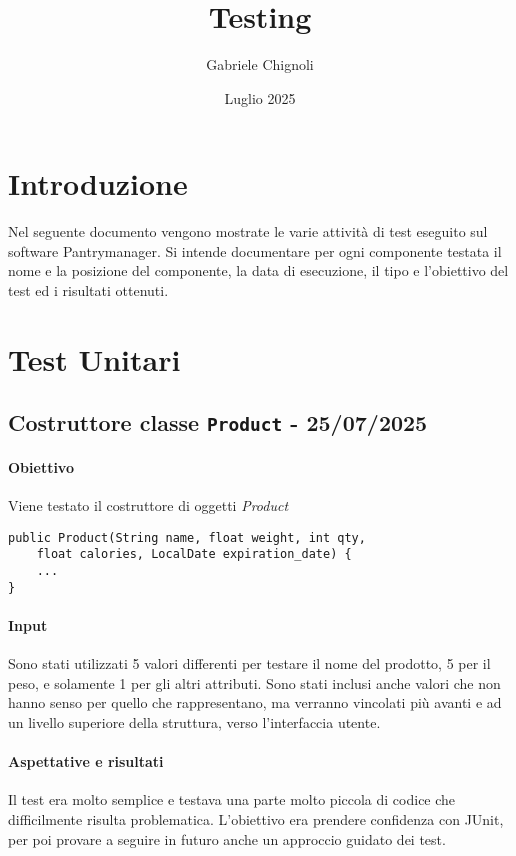 \documentclass{article}
\title{\huge Testing}
\author{Gabriele Chignoli}
\date{Luglio 2025}
\begin{document}
\setcounter{tocdepth}{5}
\maketitle
\tableofcontents
\newpage

\section{Introduzione}
Nel seguente documento vengono mostrate le varie attività di test eseguito sul software Pantrymanager. Si intende documentare per ogni componente testata il nome e la posizione del componente, la data di esecuzione, il tipo e l'obiettivo del test ed i risultati ottenuti.

\section{Test Unitari}
\subsection{Costruttore classe \texttt{Product} - 25/07/2025}

\paragraph{Obiettivo}
Viene testato il costruttore di oggetti \textit{Product}
\begin{code*}{}
\begin{verbatim}
public Product(String name, float weight, int qty, 
    float calories, LocalDate expiration_date) {
	... 
}
    \end{verbatim}
\end{code*}

\paragraph{Input}
Sono stati utilizzati 5 valori differenti per testare il nome del prodotto, 5 per il peso, e solamente 1 per gli altri attributi. Sono stati inclusi anche valori che non hanno senso per quello che rappresentano, ma verranno vincolati più avanti e ad un livello superiore della struttura, verso l'interfaccia utente.  

\paragraph{Aspettative e risultati}
Il test era molto semplice e testava una parte molto piccola di codice che difficilmente risulta problematica. L'obiettivo era prendere confidenza con JUnit, per poi provare a seguire in futuro anche un approccio guidato dei test. 
\end{document}

